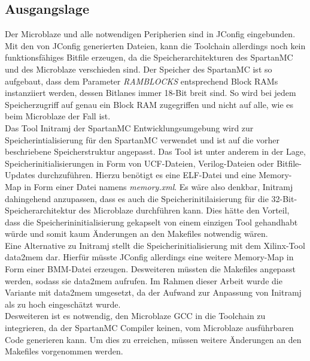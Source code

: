 \subsection{Ausgangslage}
Der Microblaze und alle notwendigen Peripherien sind in JConfig eingebunden. Mit den von JConfig generierten Dateien, kann die Toolchain allerdings noch kein funktionsfähiges Bitfile erzeugen, da die Speicherarchitekturen des SpartanMC und des Microblaze verschieden sind. Der Speicher des SpartanMC ist so aufgebaut, dass dem Parameter \textit{RAMBLOCKS} entsprechend Block RAMs instanziiert werden, dessen Bitlanes immer 18-Bit breit sind. So wird bei jedem Speicherzugriff auf genau ein Block RAM zugegriffen und nicht auf alle, wie es beim Microblaze der Fall ist.\\
Das Tool Initramj der SpartanMC Entwicklungsumgebung wird zur Speicherintialisierung für den SpartanMC verwendet und ist auf die vorher beschriebene Speicherstruktur angepasst. Das Tool ist unter anderem in der Lage, Speicherinitialisierungen in Form von UCF-Dateien, Verilog-Dateien oder Bitfile-Updates durchzuführen. Hierzu benötigt es eine ELF-Datei und eine Memory-Map in Form einer Datei namens \textit{memory.xml}. Es wäre also denkbar, Initramj dahingehend anzupassen, dass es auch die Speicherinitilaisierung für die 32-Bit-Speicherarchitektur des Microblaze durchführen kann. Dies hätte den Vorteil, dass die Speicherininitialisierung gekapselt von einem einzigen Tool gehandhabt würde und somit kaum Änderungen an den Makefiles notwendig wären.\\
Eine Alternative zu Initramj stellt die Speicherinitialisierung mit dem Xilinx-Tool data2mem dar. Hierfür müsste JConfig allerdings eine weitere Memory-Map in Form einer BMM-Datei erzeugen. Desweiteren müssten die Makefiles angepasst werden, sodass sie data2mem aufrufen. Im Rahmen dieser Arbeit wurde die Variante mit data2mem umgesetzt, da der Aufwand zur Anpassung von Initramj als zu hoch eingeschätzt wurde.\\
Desweiteren ist es notwendig, den Microblaze GCC in die Toolchain zu integrieren, da der SpartanMC Compiler keinen, vom Microblaze ausführbaren Code generieren kann. Um dies zu erreichen, müssen weitere Änderungen an den Makefiles vorgenommen werden.
